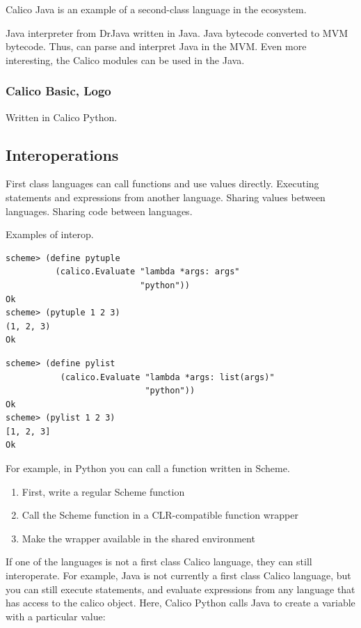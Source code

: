\documentclass[preprint]{sigplanconf}
\begin{document}
Calico Java is an example of a second-class language in the ecosystem.

Java interpreter from DrJava written in Java. Java bytecode converted
to MVM bytecode. Thus, can parse and interpret Java in the MVM. Even
more interesting, the Calico modules can be used in the Java.

\subsubsection{Calico Basic, Logo}

Written in Calico Python. 

\subsection{Interoperations}

First class languages can call functions and use values
directly. Executing statements and expressions from another language.
Sharing values between languages.  Sharing code between languages.

Examples of interop.

\begin{verbatim}
scheme> (define pytuple 
          (calico.Evaluate "lambda *args: args" 
                           "python"))
Ok
scheme> (pytuple 1 2 3)
(1, 2, 3)
Ok
\end{verbatim}


\begin{verbatim}
scheme> (define pylist 
           (calico.Evaluate "lambda *args: list(args)" 
                            "python"))
Ok
scheme> (pylist 1 2 3)
[1, 2, 3]
Ok
\end{verbatim}

For example, in Python you can call a function written in Scheme.

\begin{enumerate}
\item First, write a regular Scheme function
\item Call the Scheme function in a CLR-compatible function wrapper
\item Make the wrapper available in the shared environment
\end{enumerate}

If one of the languages is not a first class Calico language, they can
still interoperate. For example, Java is not currently a first class
Calico language, but you can still execute statements, and evaluate
expressions from any language that has access to the calico
object. Here, Calico Python calls Java to create a variable with a
particular value:
\end{document}
